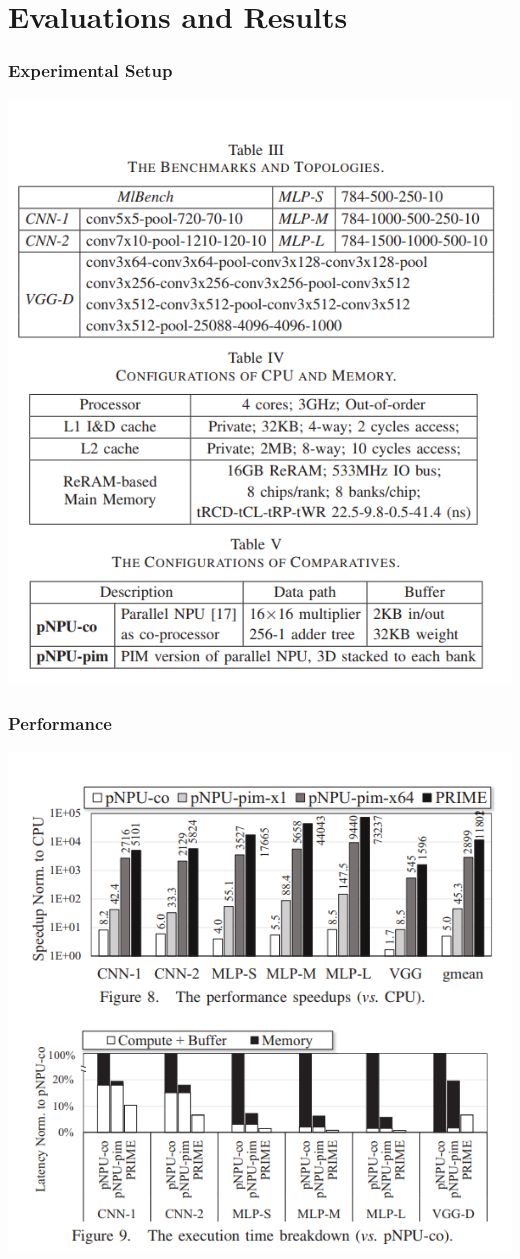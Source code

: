 \documentclass[hyperref={colorlinks}]{beamer}
\begin{document}
\section{Evaluations and Results}
\begin{frame}
	\frametitle{Experimental Setup}
	\includegraphics[scale=0.3, center]{ex_setup.png}	
\end{frame}

\begin{frame}
	\frametitle{Performance}
	\includegraphics[scale=0.4, center]{performance.png}	
\end{frame}
\end{document}
